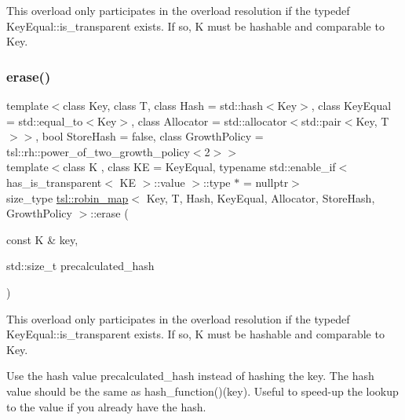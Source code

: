 This overload only participates in the overload resolution if the typedef Key\+Equal\+::is\+\_\+transparent exists. If so, K must be hashable and comparable to Key. \mbox{\label{classtsl_1_1robin__map_a88c028cec7bc33ac26a4c2922a3a63ff}} 
\subsubsection{\texorpdfstring{erase()}{erase()}\hspace{0.1cm}{\footnotesize\ttfamily [3/3]}}
{\footnotesize\ttfamily template$<$class Key, class T, class Hash = std\+::hash$<$\+Key$>$, class Key\+Equal = std\+::equal\+\_\+to$<$\+Key$>$, class Allocator = std\+::allocator$<$std\+::pair$<$\+Key, T$>$$>$, bool Store\+Hash = false, class Growth\+Policy = tsl\+::rh\+::power\+\_\+of\+\_\+two\+\_\+growth\+\_\+policy$<$2$>$$>$ \\
template$<$class K , class KE  = Key\+Equal, typename std\+::enable\+\_\+if$<$ has\+\_\+is\+\_\+transparent$<$ K\+E $>$\+::value $>$\+::type $\ast$  = nullptr$>$ \\
size\+\_\+type \mbox{\hyperlink{classtsl_1_1robin__map}{tsl\+::robin\+\_\+map}}$<$ Key, T, Hash, Key\+Equal, Allocator, Store\+Hash, Growth\+Policy $>$\+::erase (\begin{DoxyParamCaption}\item[{const K \&}]{key,  }\item[{std\+::size\+\_\+t}]{precalculated\+\_\+hash }\end{DoxyParamCaption})\hspace{0.3cm}{\ttfamily [inline]}}





This overload only participates in the overload resolution if the typedef Key\+Equal\+::is\+\_\+transparent exists. If so, K must be hashable and comparable to Key.

Use the hash value \textquotesingle{}precalculated\+\_\+hash\textquotesingle{} instead of hashing the key. The hash value should be the same as hash\+\_\+function()(key). Useful to speed-\/up the lookup to the value if you already have the hash. \mbox{\label{classtsl_1_1robin__map_a35021b11aabb61820236692a54b3a0f8}} 
